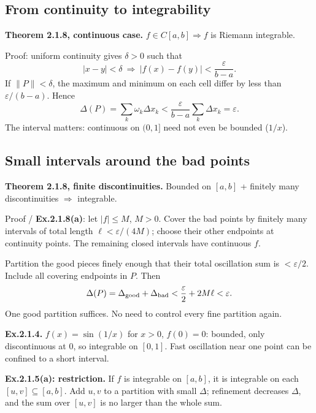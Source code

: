 \documentclass[11pt,letterpaper]{article}
\begin{document}
\subsection{From continuity to
integrability}\label{from-continuity-to-integrability}

\textbf{Theorem 2.1.8, continuous case.} \(f\in C[a,b]\Rightarrow f\) is
Riemann integrable.

Proof: uniform continuity gives \(\delta>0\) such that \[
|x-y|<\delta\ \Rightarrow\ |f(x)-f(y)|<\frac{\varepsilon}{b-a}.
\] If \(\|P\|<\delta\), the maximum and minimum on each cell differ by
less than \(\varepsilon/(b-a)\). Hence \[
\Delta(P)=\sum_k\omega_k\Delta x_k
<\frac{\varepsilon}{b-a}\sum_k\Delta x_k=\varepsilon.
\] The interval matters: continuous on \((0,1]\) need not even be
bounded (\(1/x\)).

\newpage

\subsection{Small intervals around the bad
points}\label{small-intervals-around-the-bad-points}

\textbf{Theorem 2.1.8, finite discontinuities.} Bounded on \([a,b]\) +
finitely many discontinuities \(\Rightarrow\) integrable.

Proof / \textbf{Ex.2.1.8(a)}: let \(|f|\le M\), \(M>0\). Cover the bad
points by finitely many intervals of total length
\(\ell<\varepsilon/(4M)\); choose their other endpoints at continuity
points. The remaining closed intervals have continuous \(f\).

Partition the good pieces finely enough that their total oscillation sum
is \(<\varepsilon/2\). Include all covering endpoints in \(P\). Then \[
\Delta(P)=\Delta_{\rm good}+\Delta_{\rm bad}
<\frac{\varepsilon}{2}+2M\ell<\varepsilon.
\] One good partition suffices. No need to control every fine partition
again.

\textbf{Ex.2.1.4.} \(f(x)=\sin(1/x)\) for \(x>0\), \(f(0)=0\): bounded,
only discontinuous at \(0\), so integrable on \([0,1]\). Fast
oscillation near one point can be confined to a short interval.

\textbf{Ex.2.1.5(a): restriction.} If \(f\) is integrable on \([a,b]\),
it is integrable on each \([u,v]\subseteq[a,b]\). Add \(u,v\) to a
partition with small \(\Delta\); refinement decreases \(\Delta\), and
the sum over \([u,v]\) is no larger than the whole sum.
\end{document}
